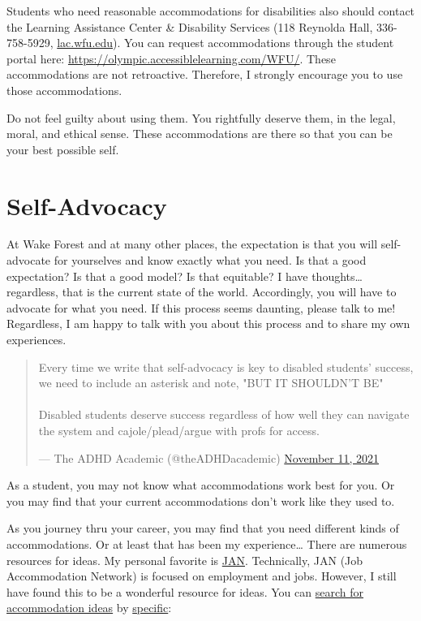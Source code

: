 Students who need reasonable accommodations for disabilities also should contact the Learning Assistance Center \& Disability Services (118 Reynolda Hall, 336-758-5929, \href{https://lac.wfu.edu/}{lac.wfu.edu}). You can request accommodations through the student portal here: \url{https://olympic.accessiblelearning.com/WFU/}. These accommodations are not retroactive. Therefore, I strongly encourage you to use those accommodations.

Do not feel guilty about using them.
You rightfully deserve them, in the legal, moral, and ethical sense.
These accommodations are there so that you can be your best possible self.

\hypertarget{self-advocacy}{%
\section{Self-Advocacy}\label{self-advocacy}}

At Wake Forest and at many other places, the expectation is that you will self-advocate for yourselves and know exactly what you need. Is that a good expectation? Is that a good model? Is that equitable? I have thoughts\ldots{} regardless, that is the current state of the world. Accordingly, you will have to advocate for what you need. If this process seems daunting, please talk to me! Regardless, I am happy to talk with you about this process and to share my own experiences.

\begin{quote}
Every time we write that self-advocacy is key to disabled students'
success, we need to include an asterisk and note, "BUT IT SHOULDN'T
BE"\\
~\\
Disabled students deserve success regardless of how well they can
navigate the system and cajole/plead/argue with profs for access.

\begin{flushright}--- The ADHD Academic (@theADHDacademic) \href{https://twitter.com/theADHDacademic/status/1458876178580881410}{November 11,
2021}\end{flushright}
\end{quote}

As a student, you may not know what accommodations work best for you. Or you may find that your current accommodations don't work like they used to.

As you journey thru your career, you may find that you need different kinds of accommodations. Or at least that has been my experience\ldots{} There are numerous resources for ideas.
My personal favorite is \href{https://askjan.org/}{JAN}. Technically, JAN (Job Accommodation Network) is focused on employment and jobs.
However, I still have found this to be a wonderful resource for ideas.
You can \href{https://askjan.org/soar.cfm}{search for accommodation ideas} by \href{https://askjan.org/a-to-z.cfm}{specific}:

